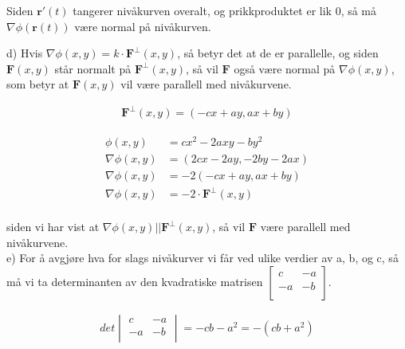 \documentclass[12pt, a4paper]{article}
\begin{document}
Siden $\textbf{r}'(t)$ tangerer nivåkurven overalt, og prikkproduktet er lik $0$, så må $\nabla\phi(\textbf{r}(t))$ være normal på nivåkurven.

\newpage

d) Hvis $\nabla\phi(x,y) = k \cdot \textbf{F}^\perp(x,y)$, så betyr det at de er parallelle, og siden $\textbf{F}(x,y)$ står normalt på $\textbf{F}^\perp(x,y)$,
så vil $\textbf{F}$ også være normal på $\nabla\phi(x,y)$, som betyr at $\textbf{F}(x,y)$ vil være parallell med nivåkurvene.

\begin{equation}
    \begin{split}
        \textbf{F}^\perp(x,y) = (-cx + ay, ax + by)
    \end{split}
\end{equation}

\begin{equation}
    \begin{split}
        \phi(x,y) &= cx^2 - 2axy - by^2 \\
        \nabla\phi(x,y) &= (2cx - 2ay, -2by - 2ax) \\
        \nabla\phi(x,y) &= -2(-cx + ay, ax + by) \\
        \nabla\phi(x,y) &= -2 \cdot \textbf{F}^\perp(x,y) \\
    \end{split}
\end{equation}

siden vi har vist at $\nabla\phi(x,y) || \textbf{F}^\perp(x,y)$, så vil $\textbf{F}$ være parallell med nivåkurvene. \\

e) For å avgjøre hva for slags nivåkurver vi får ved ulike verdier av a, b, og c, så må vi ta determinanten av den kvadratiske matrisen 
$
\begin{bmatrix}
    c  & -a \\
    -a & -b \\
\end{bmatrix}
$.

\begin{equation}
    \begin{split}
        det \begin{vmatrix}
            c  & -a \\
            -a & -b \\
        \end{vmatrix} = -cb - a^2 = -(cb + a^2)
    \end{split}
\end{equation}
\end{document}
